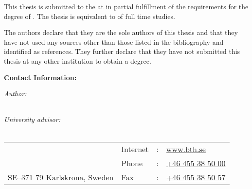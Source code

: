 
This thesis is submitted to the \getfaculty{} at \getinstitute{} in partial fulfillment of the requirements for the degree of \getdegree{}. The thesis is equivalent to \getperiod{} of full time studies.

The authors declare that they are the sole authors of this thesis and that they have not used any sources other than those listed in the bibliography and identified as references. They further declare that they have not submitted this thesis at any other institution to obtain a degree.
\newline

\textbf{Contact Information:}

\textit{Author:} \\
\getauthor{} \\
\getemail{}

\textit{University advisor:} \\
\getsupervisor{} \\
\getsupervisoraffiliation{}

\vspace*{\fill}

\begin{tabular}{@{}p{} l c l}
	\getfaculty{}                 & Internet & : & \href{https://bth.se}{www.bth.se} \\
	\getinstitute{}               & Phone    & : & \href{tel:+46455385000}{+46 455 38 50 00} \\
	SE--371 79 Karlskrona, Sweden & Fax      & : & \href{tel:+46455385057}{+46 455 38 50 57} \\
\end{tabular}

